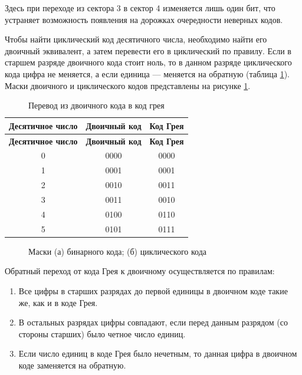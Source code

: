 Здесь при переходе из сектора 3 в сектор 4 изменяется лишь один бит, что устраняет возможность появления на дорожках очередности неверных кодов.

Чтобы найти циклический код десятичного числа, необходимо найти его двоичный эквивалент, а затем перевести его в циклический по правилу. Если в старшем разряде двоичного кода стоит ноль, то в данном разряде циклического кода цифра не меняется, а если единица --- меняется на обратную (таблица \ref{tab:bintogray}). Маски двоичного и циклического кодов представлены на рисунке \ref{fig:bincycle}.

\begin{longtable}[c]{|c|c|c|}
    \caption{Перевод из двоичного кода в код грея\label{tab:bintogray}}\\
    \hline
    \textbf{Десятичное число} & \textbf{Двоичный код} & \textbf{Код Грея}\\
    \hline
    \endfirsthead
    \hline
    \textbf{Десятичное число} & \textbf{Двоичный код} & \textbf{Код Грея}\\
    \hline
    \endhead
    0 & 0000 & 0000\\
    \hline
    1 & 0001 & 0001\\
    \hline
    2 & 0010 & 0011\\
    \hline
    3 & 0011 & 0010\\
    \hline
    4 & 0100 & 0110\\
    \hline
    5 & 0101 & 0111\\
    \hline
\end{longtable}

\begin{figure}[ht]
    \caption{Маски (а) бинарного кода; (б) циклического кода\label{fig:bincycle}}
\end{figure}

Обратный переход от кода Грея к двоичному осуществляется по правилам:

\begin{enumerate}
    \item Все цифры в старших разрядах до первой единицы в двоичном коде такие же, как и в коде Грея.
    \item В остальных разрядах цифры совпадают, если перед данным разрядом (со стороны старших) было четное число единиц.
    \item Если число единиц в коде Грея было нечетным, то данная цифра в двоичном коде заменяется на обратную.
\end{enumerate}

